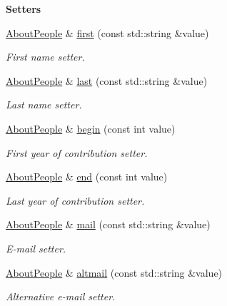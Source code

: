 \begin{Indent}{\bf Setters}\par
\begin{DoxyCompactItemize}
\item 
\hyperlink{exceptionmagrathea_1_1AboutPeople}{About\-People} \& \hyperlink{exceptionmagrathea_1_1AboutPeople_a0da00674057d019ecd1d4f9a714db3e6}{first} (const std\-::string \&value)
\begin{DoxyCompactList}\small\item\em First name setter. \end{DoxyCompactList}\item 
\hyperlink{exceptionmagrathea_1_1AboutPeople}{About\-People} \& \hyperlink{exceptionmagrathea_1_1AboutPeople_abe5aa32e065af89ac826e614ad4433e9}{last} (const std\-::string \&value)
\begin{DoxyCompactList}\small\item\em Last name setter. \end{DoxyCompactList}\item 
\hyperlink{exceptionmagrathea_1_1AboutPeople}{About\-People} \& \hyperlink{exceptionmagrathea_1_1AboutPeople_a1b9c4f0217fbbde95ffb2e205b255363}{begin} (const int value)
\begin{DoxyCompactList}\small\item\em First year of contribution setter. \end{DoxyCompactList}\item 
\hyperlink{exceptionmagrathea_1_1AboutPeople}{About\-People} \& \hyperlink{exceptionmagrathea_1_1AboutPeople_a5c6b085f737387a7a0fbb07d484db4ed}{end} (const int value)
\begin{DoxyCompactList}\small\item\em Last year of contribution setter. \end{DoxyCompactList}\item 
\hyperlink{exceptionmagrathea_1_1AboutPeople}{About\-People} \& \hyperlink{exceptionmagrathea_1_1AboutPeople_a9dbe2198e741eed1d28afdba267c1c1d}{mail} (const std\-::string \&value)
\begin{DoxyCompactList}\small\item\em E-\/mail setter. \end{DoxyCompactList}\item 
\hyperlink{exceptionmagrathea_1_1AboutPeople}{About\-People} \& \hyperlink{exceptionmagrathea_1_1AboutPeople_ad6153501056fc1fe86f5727b319a234d}{altmail} (const std\-::string \&value)
\begin{DoxyCompactList}\small\item\em Alternative e-\/mail setter. \end{DoxyCompactList}\item 

\end{DoxyCompactItemize}
\end{Indent}
